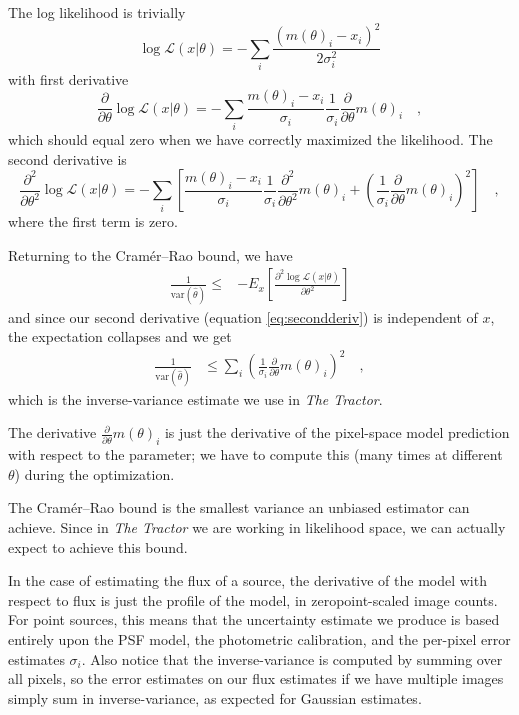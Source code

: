 \documentclass[letterpaper]{article}
\newcommand{\likelihood}{\mathcal{L}}
\newcommand{\dd}{\partial}
\newcommand{\var}{\textrm{var}}
\begin{document}
The log likelihood is trivially
\begin{equation}
\log \likelihood(x | \theta) = -\sum_i \frac{(m(\theta)_i - x_i)^2}{2 \sigma_i^2}
\end{equation}
with first derivative
\begin{equation}
\frac{\dd}{\dd \theta} \log \likelihood(x | \theta) = - \sum_i \frac{m(\theta)_i - x_i}{\sigma_i} \frac{1}{\sigma_i} \frac{\dd}{\dd \theta} m(\theta)_i
\quad ,
\end{equation}
which should equal zero when we have correctly maximized the likelihood.
The second derivative is
\begin{equation}
\frac{\dd^2}{\dd \theta^2} \log \likelihood(x | \theta) = - \sum_i \left[
  \frac{m(\theta)_i - x_i}{\sigma_i} \frac{1}{\sigma_i} \frac{\dd^2}{\dd \theta^2} m(\theta)_i
  + \left( \frac{1}{\sigma_i} \frac{\dd}{\dd \theta} m(\theta)_i \right)^2
\right]
\quad ,
\end{equation}
where the first term is zero.

Returning to the Cram\'er--Rao bound, we have
\begin{align}
\frac{1}{\var(\hat{\theta})} \le 
& - E_{x}\left[ \frac{\dd^2 \log \likelihood(x | \theta)}{\dd \theta^2} \right]
\label{eq:secondderiv}
\end{align}
and since our second derivative (equation \ref{eq:secondderiv}) is independent of $x$, the expectation
collapses and we get
\begin{align}
\frac{1}{\var(\hat{\theta})} & \le 
  \sum_i \left( \frac{1}{\sigma_i} \frac{\dd}{\dd \theta} m(\theta)_i \right)^2
  \quad ,
\end{align}
which is the inverse-variance estimate we use in \emph{The Tractor}.

The derivative $\displaystyle\frac{\dd}{\dd \theta} m(\theta)_i$ is just the
derivative of the pixel-space model prediction with respect to the
parameter; we have to compute this (many times at different $\theta$)
during the optimization.

The Cram\'er--Rao bound is the smallest variance an unbiased estimator
can achieve.  Since in \emph{The Tractor} we are working in likelihood
space, we can actually expect to achieve this bound.

In the case of estimating the flux of a source, the derivative of the
model with respect to flux is just the profile of the model, in
zeropoint-scaled image counts.  For point sources, this means that the
uncertainty estimate we produce is based entirely upon the PSF model,
the photometric calibration, and the per-pixel error estimates
$\sigma_i$.  Also notice that the inverse-variance is computed by
summing over all pixels, so the error estimates on our flux estimates
if we have multiple images simply sum in inverse-variance, as expected
for Gaussian estimates.





%
%
\end{document}
